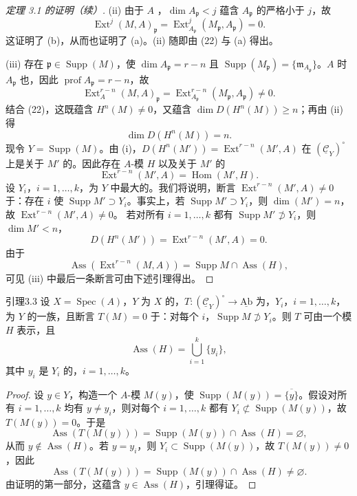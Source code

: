 \begin{proof}[定理 3.1 的证明（续）]
(ii) 由于 $A$ ，$\dim A_{\mathfrak p}<j$ 蕴含 $A_{\mathfrak p}$ 的严格小于 $j$，故
\[\operatorname{Ext}^j(M,A)_{\mathfrak p}=\operatorname{Ext}^j_{A_{\mathfrak p}}(M_{\mathfrak p},A_{\mathfrak p})=0.\]
这证明了 (b)，从而也证明了 (a)。(ii) 随即由 (22) 与 (a) 得出。

(iii) 存在 $\mathfrak p\in\operatorname{Supp}(M)$，使 $\dim A_{\mathfrak p}=r-n$ 且 $\operatorname{Supp}(M_{\mathfrak p})=\{\mathfrak m_{A_{\mathfrak p}}\}$。$A$ 时 $A_{\mathfrak p}$ 也，因此 $\operatorname{prof}A_{\mathfrak p}=r-n$，故
\[\operatorname{Ext}^{r-n}_A(M,A)_{\mathfrak p}=\operatorname{Ext}^{r-n}_{A_{\mathfrak p}}(M_{\mathfrak p},A_{\mathfrak p})\ne0.\tag{23}\]
结合 (22)，这既蕴含 $H^n(M)\ne0$，又蕴含 $\dim D(H^n(M))\ge n$；再由 (ii) 得
\[\dim D(H^n(M))=n.\]
现令 $Y=\operatorname{Supp}(M)$。由 (i)，$D(H^n(M'))=\operatorname{Ext}^{r-n}(M',A)$ 在 $(\underline{\mathcal C}_Y)^{\circ}$ 上是关于 $M'$ 的。因此存在 $A$-模 $H$ 以及关于 $M'$ 的
\[\operatorname{Ext}^{r-n}(M',A)=\operatorname{Hom}(M',H).\]
设 $Y_i$，$i=1,\ldots,k$，为 $Y$ 中最大的。我们将说明，断言 $\operatorname{Ext}^{r-n}(M',A)\ne0$ 于：存在 $i$ 使 $\operatorname{Supp}M'\supset Y_i$。事实上，若 $\operatorname{Supp}M'\supset Y_i$，则 $\dim(M')=n$，故 $\operatorname{Ext}^{r-n}(M',A)\ne0$。
若对所有 $i=1,\ldots,k$ 都有 $\operatorname{Supp}M'\not\supset Y_i$，则 $\dim M'<n$，
\[D(H^n(M'))=\operatorname{Ext}^{r-n}(M',A)=0.\]
由于
\[\operatorname{Ass}(\operatorname{Ext}^{r-n}(M,A))=\operatorname{Supp}M\cap\operatorname{Ass}(H),\]
可见 (iii) 中最后一条断言可由下述引理得出。
\end{proof}
\begin{SGAresult}{引理}{3.3}
设 $X=\operatorname{Spec}(A)$，$Y$ 为 $X$ 的，$T:(\underline{\mathcal C}_Y)^{\circ}\to\underline{\mathrm{Ab}}$ 为，$Y_i$，$i=1,\ldots,k$，为 $Y$ 的一族，且断言 $T(M)=0$ 于：对每个 $i$，$\operatorname{Supp}M\not\supset Y_i$。则 $T$ 可由一个模 $H$ 表示，且
\[\operatorname{Ass}(H)=\bigcup_{i=1}^k\{y_i\},\]
其中 $y_i$ 是 $Y_i$ 的，$i=1,\ldots,k$。
\end{SGAresult}
\begin{proof}
设 $y\in Y$，构造一个 $A$-模 $M(y)$，使 $\operatorname{Supp}(M(y))=\overline{\{y\}}$。假设对所有 $i=1,\ldots,k$ 均有 $y\ne y_i$，则对每个 $i=1,\ldots,k$ 都有 $Y_i\not\subset\operatorname{Supp}(M(y))$，故 $T(M(y))=0$。于是
\[\operatorname{Ass}(T(M(y)))=\operatorname{Supp}(M(y))\cap\operatorname{Ass}(H)=\varnothing,\]
从而 $y\notin\operatorname{Ass}(H)$。若 $y=y_i$，则 $Y_i\subset\operatorname{Supp}(M(y))$，故 $T(M(y))\ne0$，因此
\[\operatorname{Ass}(T(M(y)))=\operatorname{Supp}(M(y))\cap\operatorname{Ass}(H)\ne\varnothing.\]
由证明的第一部分，这蕴含 $y\in\operatorname{Ass}(H)$，引理得证。
\end{proof}

